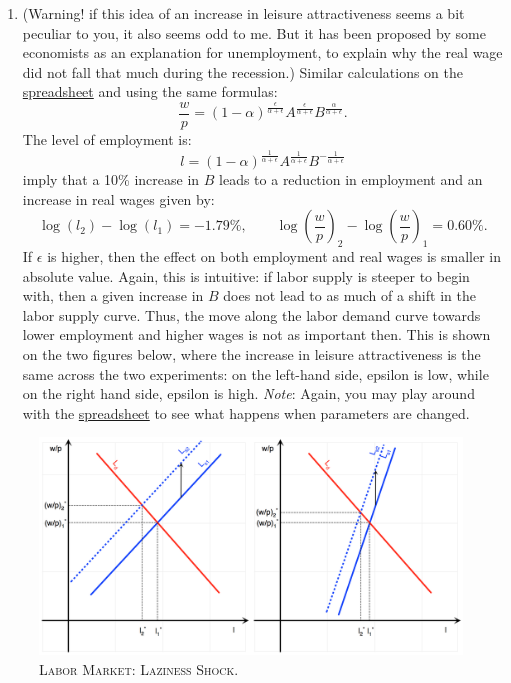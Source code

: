 \documentclass[]{book}
\providecommand{\tightlist}{%
  \setlength{\itemsep}{0pt}\setlength{\parskip}{0pt}}
\theoremstyle{definition}
\theoremstyle{definition}
\theoremstyle{definition}
\theoremstyle{remark}
\begin{document}
\begin{enumerate}
\def\labelenumi{\arabic{enumi}.}
\setcounter{enumi}{7}
\tightlist
\item
  (Warning! if this idea of an increase in leisure attractiveness seems
  a bit peculiar to you, it also seems odd to me. But it has been
  proposed by some economists as an explanation for unemployment, to
  explain why the real wage did not fall that much during the
  recession.) Similar calculations on the
  \href{https://docs.google.com/spreadsheets/d/1h9JJD8K2_IE166gdj78waf0zu4YDY9Rp3r5oiJR_06s/edit?usp=sharing}{spreadsheet}
  and using the same formulas:
  \[\frac{w}{p} = (1-\alpha)^{\frac{\epsilon}{\alpha+\epsilon}}A^{\frac{\epsilon}{\alpha+\epsilon}} B^{\frac{\alpha}{\alpha+\epsilon}}.\]
  The level of employment is:
  \[l= (1-\alpha)^{\frac{1}{\alpha+\epsilon}}A^{\frac{1}{\alpha+\epsilon}} B^{-\frac{1}{\alpha+\epsilon}}\]
  imply that a 10\% increase in \(B\) leads to a reduction in employment
  and an increase in real wages given by:
  \[\log(l_2)-\log(l_1)=-1.79\%, \qquad \log\left(\frac{w}{p}\right)_2-\log\left(\frac{w}{p}\right)_1=0.60\%.\]
  If \(\epsilon\) is higher, then the effect on both employment and real
  wages is smaller in absolute value. Again, this is intuitive: if labor
  supply is steeper to begin with, then a given increase in \(B\) does
  not lead to as much of a shift in the labor supply curve. Thus, the
  move along the labor demand curve towards lower employment and higher
  wages is not as important then. This is shown on the two figures
  below, where the increase in leisure attractiveness is the same across
  the two experiments: on the left-hand side, epsilon is low, while on
  the right hand side, epsilon is high. \emph{Note}: Again, you may play
  around with the
  \href{https://docs.google.com/spreadsheets/d/1h9JJD8K2_IE166gdj78waf0zu4YDY9Rp3r5oiJR_06s/edit?usp=sharing}{spreadsheet}
  to see what happens when parameters are changed.
\end{enumerate}



\begin{figure}

{\centering \includegraphics[width=1\linewidth]{graphsketcher/labor-market-laziness-shock-merged} 

}

\caption{\textsc{Labor Market: Laziness Shock}.}\label{fig:labor-market-laziness-shock}
\end{figure}
\end{document}
